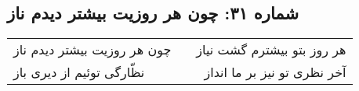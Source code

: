 \begin{center}
\section*{شماره ۳۱: چون هر روزیت بیشتر دیدم ناز}
\label{sec:031}
\begin{longtable}{l p{0.5cm} r}
چون هر روزیت بیشتر دیدم ناز
&&
هر روز بتو بیشترم گشت نیاز
\\
نظّارگی توئیم از دیری باز
&&
آخر نظری تو نیز بر ما انداز
\\
\end{longtable}
\end{center}
